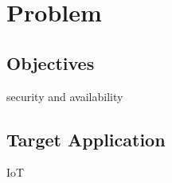 \section{Problem}
\label{sec:Solution}

\subsection{Objectives}

security and availability

\subsection{Target Application}
IoT